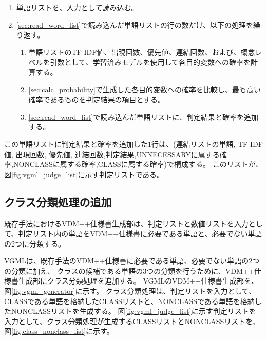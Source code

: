 \begin{enumerate}
    \item 単語リストを、入力として読み込む。
    \label{sec:read_word_list}
    \item \ref{sec:read_word_list}で読み込んだ単語リストの行の数だけ、以下の処理を繰り返す。
        \begin{enumerate}
            \item 単語リストのTF-IDF値、出現回数、優先値、連結回数、および、概念レベルを引数として、学習済みモデルを使用して各目的変数への確率を計算する。
            \label{sec:calc_probability}
            \item \ref{sec:calc_probability}で生成した各目的変数への確率を比較し、最も高い確率であるものを判定結果の項目とする。
            \item \ref{sec:read_word_list}で読み込んだ単語リストに、判定結果と確率を追加する。
        \end{enumerate}
\end{enumerate}

この単語リストに判定結果と確率を追加した1行は、(連結リストの単語, TF-IDF値, 出現回数, 優先値, 連結回数,判定結果,UNNECESSARYに属する確率,NONCLASSに属する確率,CLASSに属する確率)で構成する。
このリストが、図\ref{fig:vgml_judge_list}に示す判定リストである。

\subsection{クラス分類処理の追加}
\label{sec:classifier_class}
既存手法におけるVDM++仕様書生成部は、判定リストと数値リストを入力として、判定リスト内の単語をVDM++仕様書に必要である単語と、必要でない単語の2つに分類する。

VGMLは、既存手法のVDM++仕様書に必要である単語、必要でない単語の2つの分類に加え、
クラスの候補である単語の3つの分類を行うために、VDM++仕様書生成部にクラス分類処理を追加する。
VGMLのVDM++仕様書生成部を、図\ref{fig:vgml_generator}に示す。
クラス分類処理は、判定リストを入力として、CLASSである単語を格納したCLASSリストと、NONCLASSである単語を格納したNONCLASSリストを生成する。
図\ref{fig:vgml_judge_list}に示す判定リストを入力として、クラス分類処理が生成するCLASSリストとNONCLASSリストを、図\ref{fig:class_nonclass_list}に示す。

